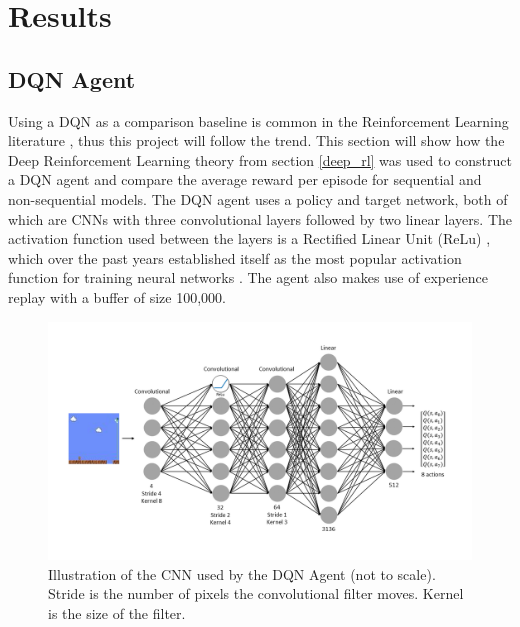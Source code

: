 \documentclass[notitlepage,a4paper,11pt]{article}
\begin{document}
\section{Results}

\subsection{DQN Agent}\label{dqn_experiment}
Using a DQN as a comparison baseline is common in the Reinforcement Learning literature \cite{bacon2017option, kulkarni2016hierarchical, hessel2018rainbow, levy2017learning}, thus this project will follow the trend. This section will show how the Deep Reinforcement Learning theory from section \ref{deep_rl} was used to construct a DQN agent and compare the average reward per episode for sequential and non-sequential models. The DQN agent uses a policy and target network, both of which are CNNs with three convolutional layers followed by two linear layers. The activation function used between the layers is a Rectified Linear Unit (ReLu) \cite{lecun2015deep}, which over the past years established itself as the most popular activation function for training neural networks \cite{ramachandran2017searching}. The agent also makes use of experience replay with a buffer of size 100,000. 

\begin{figure}[!htb]
\vspace{-40pt}
\centering
\includegraphics[trim={0 0 0 0}, clip, width=1\linewidth]{figs/dqn.png}
\vspace{-20pt}
\caption{Illustration of the CNN used by the DQN Agent (not to scale). Stride is the number of pixels the convolutional filter moves. Kernel is the size of the filter.}
\label{fig:dqn_cnn}
\end{figure}
\end{document}
